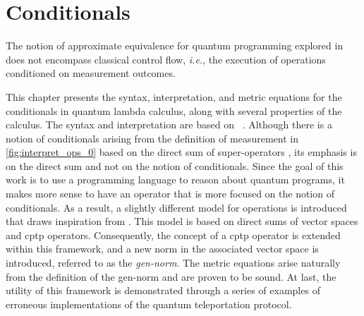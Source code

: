 \chapter{Conditionals}

The notion of approximate equivalence for quantum programming explored in \cite{dahlqvist2022syntactic} does not encompass classical control flow, \textit{i.e.}, the execution of operations conditioned on measurement outcomes. 

This chapter presents the syntax, interpretation, and metric equations for the conditionals in quantum lambda calculus, along with several properties of the calculus. The syntax and interpretation are based on  \cite{crole1993categories,selinger2013lecture,selinger2009quantum}. Although there is a notion of conditionals arising from the definition of measurement in \autoref{fig:interpret_ops_0} based on the direct sum of super-operators \cite[page 540]{watrous2018theory}, its emphasis is on the direct sum and not on the notion of conditionals. Since the goal of this work is to use a programming language to reason about quantum programs, it makes more sense to have an operator that is more focused on the notion of conditionals. As a result, a slightly different model for operations is introduced that draws inspiration from \cite{selinger2004towards}. This model is based on direct sums of vector spaces and \acrshort{cptp} operators. Consequently, the concept of a \acrshort{cptp} operator is extended within this framework, and a new norm in the associated vector space is introduced, referred to as the \emph{gen-norm}. The metric equations arise naturally from the definition of the gen-norm and are proven to be sound. At last, the utility of this framework is demonstrated through a series of examples of erroneous implementations of the quantum teleportation protocol.



